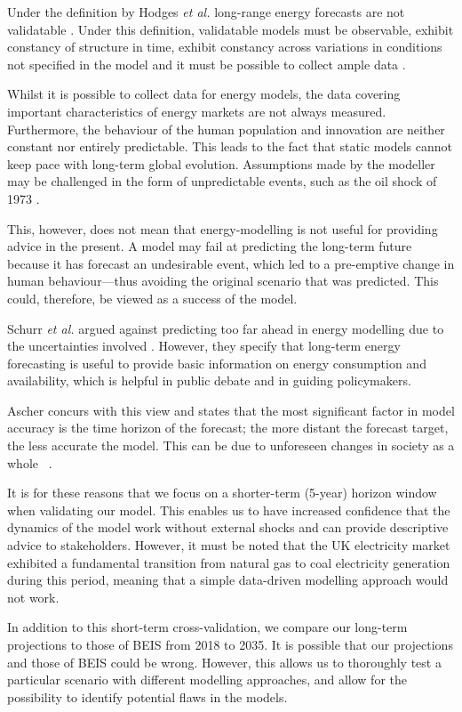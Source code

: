 Under the definition by Hodges \textit{et al.} \cite{Hodges} long-range energy forecasts are not validatable \cite{Craig2002}. Under this definition, validatable models must be observable, exhibit constancy of structure in time, exhibit constancy across variations in conditions not specified in the model and it must be possible to collect ample data \cite{Hodges}.


Whilst it is possible to collect data for energy models, the data covering important characteristics of energy markets are not always measured. Furthermore, the behaviour of the human population and innovation are neither constant nor entirely predictable. This leads to the fact that static models cannot keep pace with long-term global evolution. Assumptions made by the modeller may be challenged in the form of unpredictable events, such as the oil shock of 1973 \cite{Craig2002}.

This, however, does not mean that energy-modelling is not useful for providing advice in the present. A model may fail at predicting the long-term future because it has forecast an undesirable event, which led to a pre-emptive change in human behaviour—thus avoiding the original scenario that was predicted. This could, therefore, be viewed as a success of the model.

Schurr \textit{et al.} argued against predicting too far ahead in energy modelling due to the uncertainties involved \cite{Schurr_1961}. However, they specify that long-term energy forecasting is useful to provide basic information on energy consumption and availability, which is helpful in public debate and in guiding policymakers.


Ascher concurs with this view and states that the most significant factor in model accuracy is the time horizon of the forecast; the more distant the forecast target, the less accurate the model. This can be due to unforeseen changes in society as a whole ~\cite{gillespie_1979}.

It is for these reasons that we focus on a shorter-term (5-year) horizon window when validating our model. This enables us to have increased confidence that the dynamics of the model work without external shocks and can provide descriptive advice to stakeholders. However, it must be noted that the UK electricity market exhibited a fundamental transition from natural gas to coal electricity generation during this period, meaning that a simple data-driven modelling approach would not work.

In addition to this short-term cross-validation, we compare our long-term projections to those of BEIS from 2018 to 2035. It is possible that our projections and those of BEIS could be wrong. However, this allows us to thoroughly test a particular scenario with different modelling approaches, and allow for the possibility to identify potential flaws in the models.


